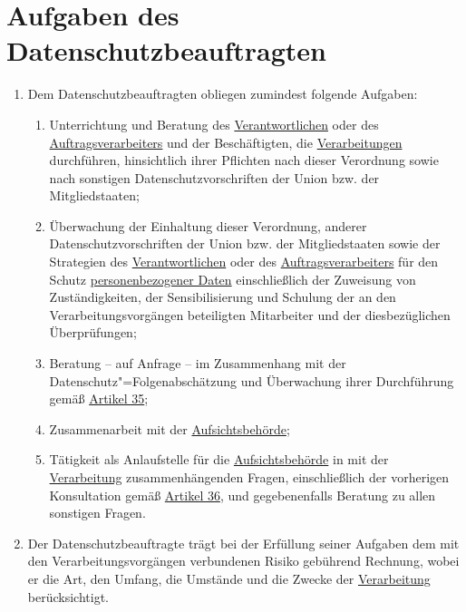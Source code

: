 \chapter{Aufgaben des Datenschutzbeauftragten}
\label{ch:39}

\begin{enumerate}

  \item Dem Datenschutzbeauftragten obliegen zumindest folgende Aufgaben:%
  \label{itm:39-1}

  \begin{enumerate}
  
    \item Unterrichtung und Beratung des \hyperref[itm:04-7]{Verantwortlichen} oder des \hyperref[itm:04-8]
     {Auftragsverarbeiters} und der Beschäftigten, die
     \hyperref[itm:04-2]{Verarbeitungen} durchführen, hinsichtlich ihrer Pflichten nach dieser Verordnung sowie nach
      sonstigen Datenschutzvorschriften der Union bzw. der Mitgliedstaaten;%
    \label{itm:39-1a}

    \item Überwachung der Einhaltung dieser Verordnung, anderer Datenschutzvorschriften der Union bzw. der
     Mitgliedstaaten sowie der Strategien des \hyperref[itm:04-7]{Verantwortlichen} oder des \hyperref[itm:04-8]
     {Auftragsverarbeiters} für den Schutz
     \hyperref[itm:04-1]{personenbezogener Daten} einschließlich der Zuweisung von Zuständigkeiten, der Sensibilisierung
      und Schulung der an den Verarbeitungsvorgängen beteiligten Mitarbeiter und der diesbezüglichen Überprüfungen;%
    \label{itm:39-1b}

    \item Beratung -- auf Anfrage -- im Zusammenhang mit der Datenschutz"=Folgenabschätzung und Überwachung ihrer
     Durchführung gemäß \hyperref[ch:35]{Artikel 35};%
    \label{itm:39-1c}

    \item Zusammenarbeit mit der \hyperref[itm:04-21]{Aufsichtsbehörde};%
    \label{itm:39-1d}

    \item Tätigkeit als Anlaufstelle für die \hyperref[itm:04-21]{Aufsichtsbehörde} in mit der \hyperref[itm:04-2]
     {Verarbeitung} zusammenhängenden Fragen, einschließlich der vorherigen Konsultation gemäß \hyperref[ch:36]
     {Artikel 36}, und gegebenenfalls Beratung zu allen sonstigen Fragen.%
    \label{itm:39-1e}

  \end{enumerate}

  \item Der Datenschutzbeauftragte trägt bei der Erfüllung seiner Aufgaben dem mit den Verarbeitungsvorgängen
   verbundenen Risiko gebührend Rechnung, wobei er die Art, den Umfang, die Umstände und die Zwecke der \hyperref
   [itm:04-2]{Verarbeitung} berücksichtigt.%
  \label{itm:39-e}

\end{enumerate}


